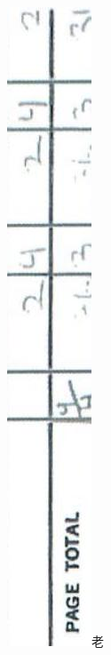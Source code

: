 \documentclass[10pt]{article}
\begin{document}
\includegraphics[max width=\textwidth]{2025_02_27_dd68c3d38de88f0516d9g-019(6)}老\\
\end{document}
